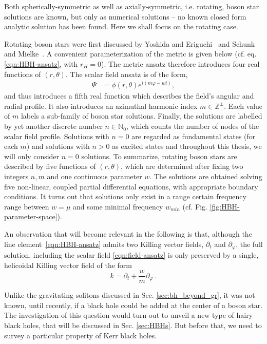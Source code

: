 Both spherically-symmetric as well as axially-symmetric, i.e. rotating, boson star solutions are known, but only as numerical solutions -- no known closed form analytic solution has been found.
Here we shall focus on the rotating case. 

Rotating boson stars were first discussed by Yoshida and Eriguchi~\cite{Yoshida:1997qf} and Schunk and Mielke~\cite{Schunck:1996he}.
A convenient parameterization of the metric is given below (cf. eq. \eqref{eqn:HBH-ansatz}, with $r_H=0$).
The metric ansatz therefore introduces four real functions of $(r,\theta)$.
The scalar field ansatz is of the form, 
\begin{align}
  \Psi &= \phi(r,\theta)e^{i(m\varphi-w t)},
  \label{eqn:field-ansatz}
\end{align}
and thus introduces a fifth real function which describes the field's angular and radial profile.
It also introduces an azimuthal harmonic index $m\in \mathbb{Z}^\pm$.
Each value of $m$ labels a sub-family of boson star solutions.
Finally, the solutions are labelled by yet another discrete number $n\in \mathbb{N}_0$, which counts the number of nodes of the scalar field profile.
Solutions with $n=0$ are regarded as fundamental states (for each $m$) and solutions with $n>0$ as excited states and throughout this thesis, we will only consider $n=0$ solutions.
To summarize, rotating boson stars are described by five functions of $(r,\theta)$, which are determined after fixing two integers $n,m$ and one continuous parameter $w$.
The solutions are obtained solving five non-linear, coupled partial differential equations, with appropriate boundary conditions.
It turns out that solutions only exist in a range certain frequency range between $w=\mu$ and some minimal frequency $w_{min}$ (cf. Fig. \ref{fig:HBH-parameter-space}).

An observation that will become relevant in the following is that, although the line element~\eqref{eqn:HBH-ansatz} admits two Killing vector fields, $\partial_t$ and $\partial_\varphi$, the full solution, including the scalar field \eqref{eqn:field-ansatz} is only preserved by a single, helicoidal Killing vector field of the form
\begin{equation}
k=\partial_t+\frac{w}{m}\partial_\varphi \ . 
\label{kvf}
\end{equation}

Unlike the gravitating solitons discussed in Sec. \ref{sec:bh_beyond_gr}, it was not known, until recently, if a black hole could be added at the center of a boson star.
The investigation of this question would turn out to unveil a new type of hairy black holes, that will be discussed in Sec. \ref{sec:HBHs}.
But before that, we need to survey a particular property of Kerr black holes. 
